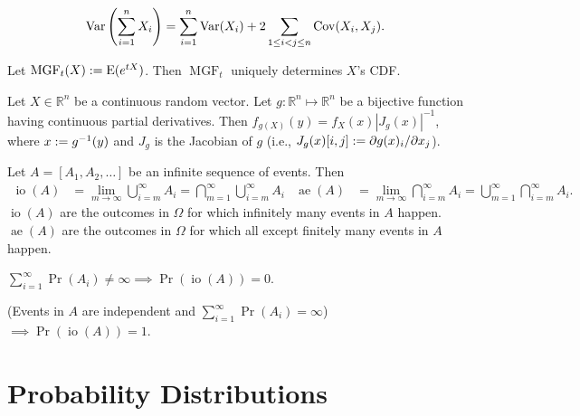 \documentclass[a4paper, 12pt, fleqn]{article}
\DeclareMathOperator{\MGF}{MGF}
\DeclareMathOperator{\Cov}{Cov}
\DeclareMathOperator{\infOft}{io}
\DeclareMathOperator{\almEv}{ae}
\begin{document}
\begin{theorem}
\[ \Var\left(\sum_{i=1}^n X_i\right) = \sum_{i=1}^n \Var(X_i) + 2\sum_{1 \le i < j \le n} \Cov(X_i, X_j). \]
\end{theorem}

\begin{theorem}
Let $\MGF_t(X) \defeq \E(e^{tX})$. Then $\MGF_t$ uniquely determines $X$'s CDF.
\end{theorem}

\begin{theorem}
Let $X \in \mathbb{R}^n$ be a continuous random vector.
Let $g: \mathbb{R}^n \mapsto \mathbb{R}^n$ be a bijective function
having continuous partial derivatives.
Then $f_{g(X)}(y) = f_X(x)|J_g(x)|^{-1}$, where $x := g^{-1}(y)$
and $J_g$ is the Jacobian of $g$
(i.e., $J_g(x)[i,j] := \partial g(x)_i/\partial x_j$).
\end{theorem}

\begin{definition}
Let $A = [A_1, A_2, \ldots]$ be an infinite sequence of events. Then
\begin{align*}
\infOft(A) &= \lim_{m \to \infty} \bigcup_{i=m}^{\infty} A_i
    = \bigcap_{m=1}^{\infty} \bigcup_{i=m}^{\infty} A_i
& \almEv(A) &= \lim_{m \to \infty} \bigcap_{i=m}^{\infty} A_i
    = \bigcup_{m=1}^{\infty} \bigcap_{i=m}^{\infty} A_i.
\end{align*}
$\infOft(A)$ are the outcomes in $\Omega$ for which infinitely many events in $A$ happen.
$\almEv(A)$ are the outcomes in $\Omega$ for which all except finitely many events in $A$ happen.
\end{definition}

\begin{lemma}
$\sum_{i=1}^{\infty} \Pr(A_i) \neq \infty \implies \Pr(\infOft(A)) = 0$.
\end{lemma}

\begin{lemma}
(Events in $A$ are independent and
$\sum_{i=1}^{\infty} \Pr(A_i) = \infty$) $\implies \Pr(\infOft(A)) = 1$.
\end{lemma}

\section{Probability Distributions}
\end{document}
